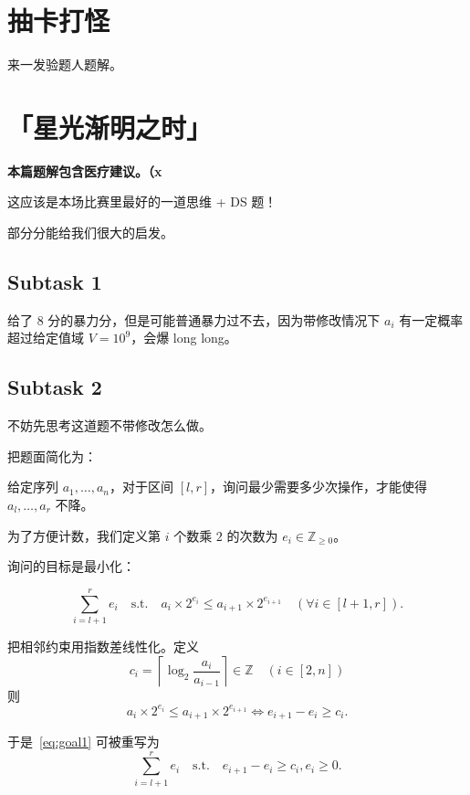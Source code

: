 \documentclass[14pt,a4paper]{article}
\begin{document}
\section{抽卡打怪}
来一发验题人题解。

\section{「星光渐明之时」}
\textbf{本篇题解包含医疗建议。（x}

这应该是本场比赛里最好的一道思维 + DS 题！

部分分能给我们很大的启发。

\subsection{Subtask 1}
给了 $8$ 分的暴力分，但是可能普通暴力过不去，因为带修改情况下 $a_i$ 有一定概率超过给定值域 $V = 10^9$，会爆 long long。

\subsection{Subtask 2}

\begin{hintbox}
不妨先思考这道题不带修改怎么做。
\end{hintbox}

把题面简化为：

给定序列 $a_1, \dots, a_n$，对于区间 $[l,r]$，询问最少需要多少次操作，才能使得 $a_l, \dots, a_r$ 不降。

为了方便计数，我们定义第 $i$ 个数乘 $2$ 的次数为 $e_i \in \mathbb{Z}_{\ge 0}$。

询问的目标是最小化：

\begin{equation}
    \sum_{i=l+1}^{r} e_i \quad \text{s.t.} \quad a_i\times 2^{e_i} \le a_{i+1}\times 2^{e_{i+1}} \quad (\forall i \in [l+1, r]).
    \label{eq:goal1}
\end{equation}


把相邻约束用指数差线性化。定义
\begin{equation}
    c_i = \left \lceil \log_2 \frac{a_{i}}{a_{i-1}} \right \rceil \in \mathbb{Z} \quad (i \in [2,n])
\end{equation}
则
\begin{equation}
    a_i\times 2^{e_i} \le a_{i+1}\times 2^{e_{i+1}} \iff e_{i+1} - e_i \ge c_i.
\end{equation}

于是~\eqref{eq:goal1} 可被重写为
\begin{equation}
    \sum_{i=l+1}^{r} e_i \quad \text{s.t.} \quad e_{i+1} - e_i \ge c_i, e_i \ge 0.
    \label{eq:goal2}
\end{equation}
\end{document}
